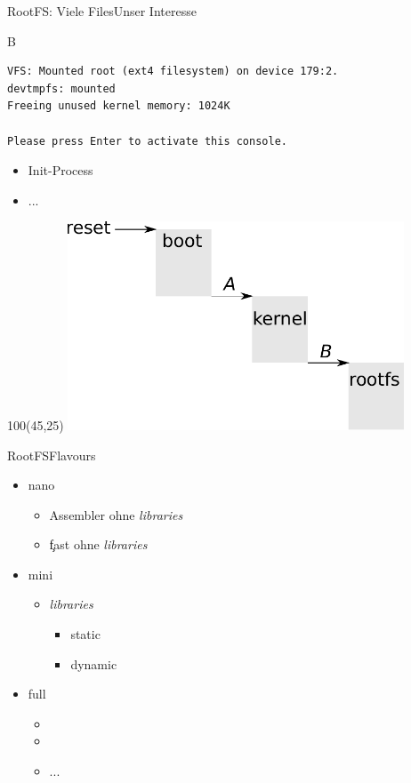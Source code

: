\documentclass{beamer}
\begin{document}
\begin{frame}[fragile]{RootFS: Viele Files}{Unser Interesse}
\begin{block}{B}
{
\tiny
\begin{verbatim}
VFS: Mounted root (ext4 filesystem) on device 179:2.
devtmpfs: mounted
Freeing unused kernel memory: 1024K

Please press Enter to activate this console. 
\end{verbatim}
}
\end{block}
\begin{itemize}
 \item {} Init-Process
 \item ...
\end{itemize}
\begin{textblock}{100}(45,25)
 \includegraphics[width=0.75\textwidth]{components.pdf}
\end{textblock} 

\end{frame}

\begin{frame}{RootFS}{Flavours}
 \begin{itemize}
  \item nano
  \begin{itemize}
   \item Assembler ohne {\em libraries} 
   \item \c fast ohne {\em libraries} 
  \end{itemize}
  \item mini
  \begin{itemize}
   \item {\em libraries}
   \begin{itemize}
    \item static
    \item dynamic
   \end{itemize}
  \end{itemize}
  \item full
  \begin{itemize}
   \item {}
   \item {}
   \item ...
  \end{itemize}
 \end{itemize}
\end{frame}





\end{document}
